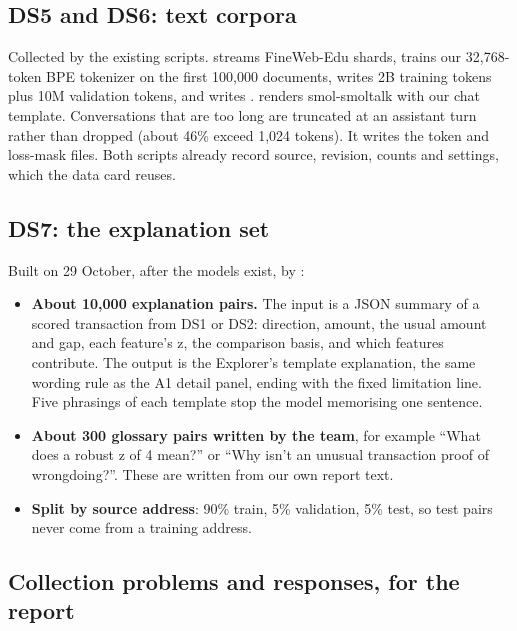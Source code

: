 \subsection{DS5 and DS6: text corpora}
\label{sec:ds56}

Collected by the existing scripts.  streams
FineWeb-Edu shards, trains our 32,768-token BPE tokenizer on the first 100,000 documents, writes
2B training tokens plus 10M validation tokens, and writes .
 renders smol-smoltalk with our chat template. Conversations that
are too long are truncated at an assistant turn rather than dropped (about 46\% exceed 1,024
tokens). It writes the token and loss-mask files. Both scripts already record source, revision,
counts and settings, which the data card reuses.

\subsection{DS7: the explanation set}
\label{sec:ds7}

Built on 29 October, after the models exist, by :
\begin{itemize}
  \item \textbf{About 10,000 explanation pairs.} The input is a JSON summary of a scored
    transaction from DS1 or DS2: direction, amount, the usual amount and gap, each feature's z,
    the comparison basis, and which features contribute. The output is the Explorer's template
    explanation, the same wording rule as the A1 detail panel, ending with the fixed limitation
    line. Five phrasings of each template stop the model memorising one sentence.
  \item \textbf{About 300 glossary pairs written by the team}, for example ``What does a robust z
    of 4 mean?'' or ``Why isn't an unusual transaction proof of wrongdoing?''. These are written
    from our own report text.
  \item \textbf{Split by source address}: 90\% train, 5\% validation, 5\% test, so test pairs
    never come from a training address.
\end{itemize}

\subsection{Collection problems and responses, for the report}
\label{sec:challenges}

